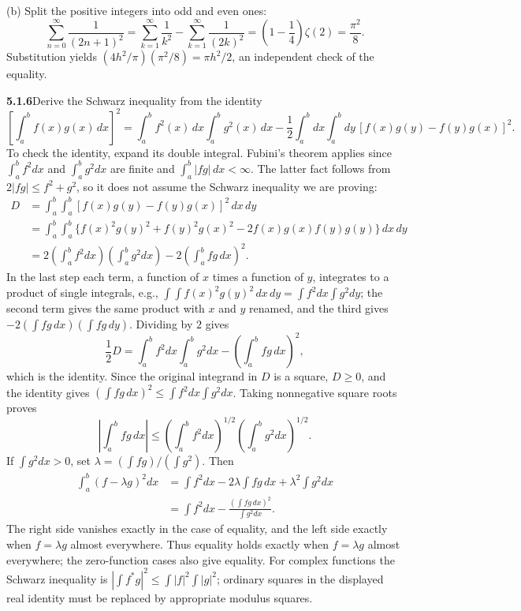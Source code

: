 (b) Split the positive integers into odd and even ones:
\[
\sum_{n=0}^\infty\frac1{(2n+1)^2}
=\sum_{k=1}^\infty\frac1{k^2}
 -\sum_{k=1}^\infty\frac1{(2k)^2}
=\left(1-\frac14\right)\zeta(2)=\frac{\pi^2}{8}.
\]
Substitution yields
$(4h^2/\pi)(\pi^2/8)=\pi h^2/2$, an independent check of the equality.

\par\bigskip
\noindent\textbf{5.1.6}\quad Derive the Schwarz inequality  from the identity
\[
\left[\int_{a}^{b}f(x)g(x)\,dx\right]^{2}
=\int_{a}^{b}f^{2}(x)\,dx\int_{a}^{b}g^{2}(x)\,dx
-\frac{1}{2}\int_{a}^{b}dx\int_{a}^{b}dy\,
[f(x)g(y)-f(y)g(x)]^{2}.
\]
\solution
{}
To check the identity, expand its double integral. Fubini's theorem
applies since $\int_a^bf^2dx$ and $\int_a^bg^2dx$ are finite and
$\int_a^b|fg|\,dx<\infty$. The latter fact follows from
$2|fg|\le f^2+g^2$, so it does not assume the Schwarz inequality we
are proving:
\begin{align*}
D&=\int_a^b\!\int_a^b[f(x)g(y)-f(y)g(x)]^2\,dx\,dy\\
&=\int_a^b\!\int_a^b
 \{f(x)^2g(y)^2+f(y)^2g(x)^2
          -2f(x)g(x)f(y)g(y)\}\,dx\,dy\\
&=2\left(\int_a^bf^2dx\right)\left(\int_a^bg^2dx\right)
 -2\left(\int_a^bfg\,dx\right)^2.
\end{align*}
In the last step each term, a function of $x$ times a function of $y$,
integrates to a product of single integrals, e.g.,
$\int\!\!\int f(x)^2g(y)^2\,dx\,dy=\int f^2dx\int g^2dy$; the second term
gives the same product with $x$ and $y$ renamed, and the third gives
$-2(\int fg\,dx)(\int fg\,dy)$. Dividing by $2$ gives
\[
\frac12D=\int_a^bf^2dx\int_a^bg^2dx-\left(\int_a^bfg\,dx\right)^2,
\]
which is the identity.
Since the original integrand in $D$ is a square, $D\ge0$, and the
identity gives $(\int fg\,dx)^2\le\int f^2dx\int g^2dx$. Taking
nonnegative square roots proves
\[
\boxed{\left|\int_a^bfg\,dx\right|
\le\left(\int_a^bf^2dx\right)^{1/2}
   \left(\int_a^bg^2dx\right)^{1/2}}.
\]
If $\int g^2dx>0$, set $\lambda=(\int fg)/(\int g^2)$. Then
\begin{align*}
\int_a^b(f-\lambda g)^2dx
&=\int f^2dx-2\lambda\int fg\,dx+\lambda^2\int g^2dx\\
&=\int f^2dx-\frac{(\int fg\,dx)^2}{\int g^2dx}.
\end{align*}
The right side vanishes exactly in the case of equality, and the left
side exactly when $f=\lambda g$ almost everywhere. Thus equality holds
exactly when $f=\lambda g$ almost everywhere; the zero-function cases also
give equality. For complex functions the
Schwarz inequality is $|\int f^*g|^2\le\int|f|^2\int|g|^2$;
ordinary squares in the displayed real identity must be replaced by
appropriate modulus squares.

